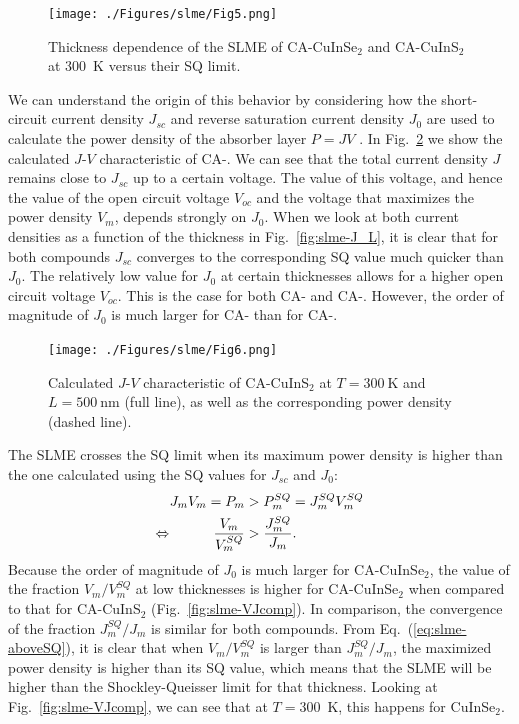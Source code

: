 \begin{refsection}
\begin{figure}[htbp]
	\centering
		\texttt{[image: ./Figures/slme/Fig5.png]}
	\caption{Thickness dependence of the SLME of CA-CuInSe$_2$ and CA-CuInS$_2$ at 300~\si{\kelvin} versus their SQ limit.}
	\label{fig:slme-SLME_L}
\end{figure}

We can understand the origin of this behavior by considering how the short-circuit current density $J_{sc}$ and reverse saturation current density $J_0$ are used to calculate the power density of the absorber layer $P = JV$ . In Fig.~\ref{fig:slme-CuInS2_JV} we show the calculated \mbox{$J$-$V$} characteristic of \mbox{CA-}. We can see that the total current density $J$ remains close to $J_{sc}$ up to a certain voltage. The value of this voltage, and hence the value of the open circuit voltage $V_{oc}$ and the voltage that maximizes the power density $V_{m}$, depends strongly on $J_0$. When we look at both current densities as a function of the thickness in Fig.~\ref{fig:slme-J_L}, it is clear that for both compounds $J_{sc}$ converges to the corresponding SQ value much quicker than $J_0$. The relatively low value for $J_0$ at certain thicknesses allows for a higher open circuit voltage $V_{oc}$. This is the case for both \mbox{CA-} and \mbox{CA-}. However, the order of magnitude of $J_0$ is much larger for CA- than for \mbox{CA-}.

\begin{figure}[htbp]
	\centering
		\texttt{[image: ./Figures/slme/Fig6.png]}
	\caption{Calculated $J$-$V$ characteristic of CA-CuInS$_2$ at $T=300~\si{\kelvin}$ and $L = 500~\si{\nano\meter}$ (full line), as well as the corresponding power density (dashed line).}
	\label{fig:slme-CuInS2_JV}
\end{figure}

The SLME crosses the SQ limit when its maximum power density is higher than the one calculated using the SQ values for $J_{sc}$ and $J_0$:
\begin{equation} \label{eq:slme-aboveSQ}
\begin{aligned}
J_m V_m = P_m &> P_m^{SQ} = J_m^{SQ} V_m^{SQ} \\
\Leftrightarrow \hspace{0.4in}\frac{V_m}{V_m^{SQ}} &> \frac{J_m^{SQ}}{J_m}.
\end{aligned}
\end{equation}
Because the order of magnitude of $J_0$ is much larger for \mbox{CA-CuInSe$_2$}, the value of the fraction $V_m/V_m^{SQ}$ at low thicknesses is higher for \mbox{CA-CuInSe$_2$} when compared to that for \mbox{CA-CuInS$_2$} (Fig.~\ref{fig:slme-VJcomp}). In comparison, the convergence of the fraction $J_m^{SQ}/J_m$ is similar for both compounds. From Eq.~(\ref{eq:slme-aboveSQ}), it is clear that when $V_m/V_m^{SQ}$ is larger than $J_m^{SQ}/J_m$, the maximized power density is higher than its SQ value, which means that the SLME will be higher than the Shockley-Queisser limit for that thickness. Looking at Fig.~\ref{fig:slme-VJcomp}, we can see that at $T=300$~\si{\kelvin}, this happens for CuInSe$_2$.


\end{refsection}
